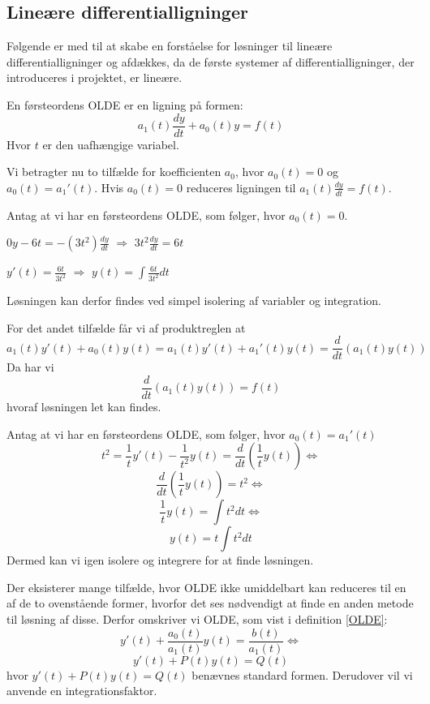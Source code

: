 \subsection{Lineære differentialligninger}
Følgende er med til at skabe en forståelse for løsninger til lineære differentialligninger og afdækkes, da de første systemer af differentialligninger, der introduceres i projektet, er lineære.
\hfill \break

En førsteordens OLDE er en ligning på formen: \\ 
$$a_{1}(t) \frac{dy}{dt} + a_{0}(t)y = f(t)$$ Hvor $t$ er den uafhængige variabel. \hfill \break

Vi betragter nu to tilfælde for koefficienten $a_0$, hvor $a_0(t) = 0$ og $a_0(t) = a_1'(t)$. Hvis $a_0(t) = 0$ reduceres ligningen til $a_1(t)\frac{dy}{dt} = f(t)$.  
\begin{Example}\hfill \break
\textnormal{Antag at vi har en førsteordens OLDE, som følger, hvor $a_0(t) = 0$.}\\
\hfill \break
\centerline{$0y - 6t = -(3t^2) \frac{dy}{dt}$ $\Rightarrow$ $3t^2 \frac{dy}{dt} = 6t$}
\hfill \break
\centerline{$y'(t) = \frac{6t}{3t^2}$ $\Rightarrow$ $y(t) = \int \frac{6t}{3t^2}dt$}
\hfill \break
\textnormal{Løsningen kan derfor findes ved simpel isolering af variabler og integration.}
\end{Example}

For det andet tilfælde får vi af produktreglen at $$a_1(t)y'(t) + a_0(t)y(t) = a_1(t)y'(t) + a_1'(t)y(t) = \frac{d}{dt}(a_1(t)y(t))$$Da har vi $$\frac{d}{dt}(a_1(t)y(t)) = f(t)$$ hvoraf løsningen let kan findes.

\begin{Example} \hfill \break
\textnormal{Antag at vi har en førsteordens OLDE, som følger, hvor $a_0(t) = a_1'(t)$} \\
\hfill \break
$$t^2 = \frac{1}{t}y'(t) -\frac{1}{t^2}y(t) = \frac{d}{dt}(\frac{1}{t}y(t))\Leftrightarrow$$
$$\frac{d}{dt}(\frac{1}{t}y(t)) = t^2\Leftrightarrow$$
$$\frac{1}{t}y(t) = \int t^2dt \Leftrightarrow$$ $$ y(t) = t \int t^2dt$$
\hfill \break
\textnormal{Dermed kan vi igen isolere og integrere for at finde løsningen.}
\end{Example}

Der eksisterer mange tilfælde, hvor OLDE ikke umiddelbart kan reduceres til en af de to ovenstående former, hvorfor det ses nødvendigt at finde en anden metode til løsning af disse. Derfor omskriver vi OLDE, som vist i definition \ref{OLDE}: $${y'(t) + \frac{a_0(t)}{a_1(t)}y(t) = \frac{b(t)}{a_1(t)}} \Leftrightarrow$$
$$y'(t) + P(t)y(t) = Q(t)$$ hvor $y'(t) + P(t)y(t) = Q(t)$ benævnes standard formen. Derudover vil vi anvende en integrationsfaktor.

